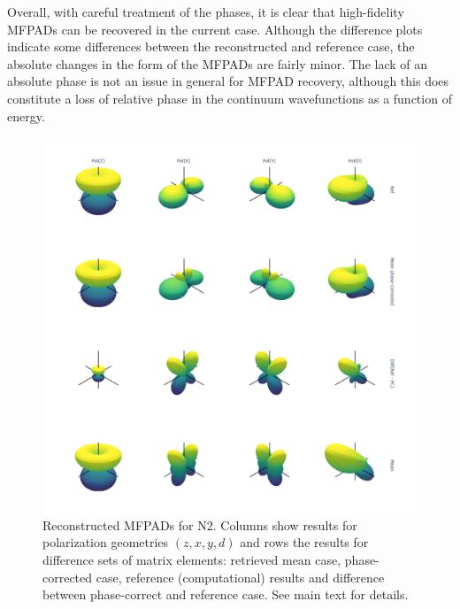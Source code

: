 \documentclass[10pt]{article}
\begin{document}
Overall, with careful treatment of the phases, it is clear that high-fidelity MFPADs can be recovered in the current case. Although the difference plots indicate some differences between the reconstructed and reference case, the absolute changes in the form of the MFPADs are fairly minor. The lack of an absolute phase is not an issue in general for MFPAD recovery, although this does constitute a loss of relative phase in the continuum wavefunctions as a function of energy. %


\begin{figure}[]
\begin{center}
\includegraphics[width=\textwidth,height=\dimexpr\textheight-4\baselineskip-\abovecaptionskip-\belowcaptionskip\relax,keepaspectratio]{figures/dataDump_1000fitTests_multiFit_noise_051021_MFPADs_100323.png}
\caption{Reconstructed MFPADs for N2. Columns show results for polarization geometries \((z,x,y,d)\) and rows the results for difference sets of matrix elements: retrieved mean case, phase-corrected case, reference (computational) results and difference between phase-correct and reference case. See main text for details.\label{454268}}
\end{center}
\end{figure}
\end{document}

